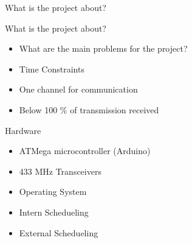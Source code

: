 \begin{frame}{What is the project about?}
	\begin{block}{What is the project about?}
	 	\begin{itemize}
			\item What are the main problems for the project?
			\item Time Constraints
			\item One channel for communication
			\item Below 100 \% of transmission received
		\end{itemize}
	\end{block}

	\begin{block}{Hardware}
		\begin{itemize}
			\item ATMega microcontroller (Arduino)
			\item 433 MHz Transceivers
			\item Operating System
			\item Intern Schedueling
			\item External Schedueling
		\end{itemize}
	\end{block}

\end{frame}

